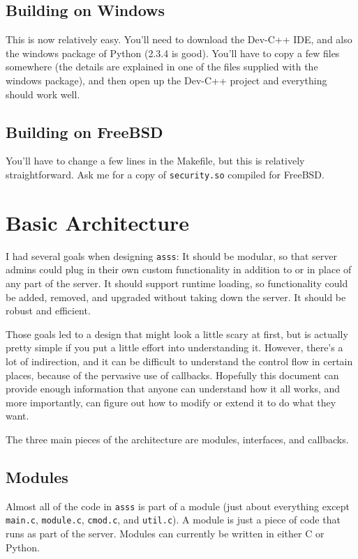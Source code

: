 \documentclass{article}
\newcommand{\asss}{\texttt{asss}}
\begin{document}
\subsection{Building on Windows}

This is now relatively easy. You'll need to download the Dev-C++ IDE,
and also the windows package of Python (2.3.4 is good). You'll have to
copy a few files somewhere (the details are explained in one of the
files supplied with the windows package), and then open up the Dev-C++
project and everything should work well.


\subsection{Building on FreeBSD}

You'll have to change a few lines in the Makefile, but this is
relatively straightforward. Ask me for a copy of \verb/security.so/
compiled for FreeBSD.


\section{Basic Architecture}

I had several goals when designing \asss{}: It should be modular, so
that server admins could plug in their own custom functionality in
addition to or in place of any part of the server. It should support
runtime loading, so functionality could be added, removed, and upgraded
without taking down the server. It should be robust and efficient.

Those goals led to a design that might look a little scary at first, but
is actually pretty simple if you put a little effort into understanding
it. However, there's a lot of indirection, and it can be difficult to
understand the control flow in certain places, because of the pervasive
use of callbacks. Hopefully this document can provide enough information
that anyone can understand how it all works, and more importantly, can
figure out how to modify or extend it to do what they want.

The three main pieces of the architecture are modules, interfaces, and
callbacks.

\subsection{Modules}

Almost all of the code in \asss{} is part of a module (just about
everything except \verb/main.c/, \verb/module.c/, \verb/cmod.c/, and
\verb/util.c/). A module is just a piece of code that runs as part of
the server. Modules can currently be written in either C or Python.
\end{document}
